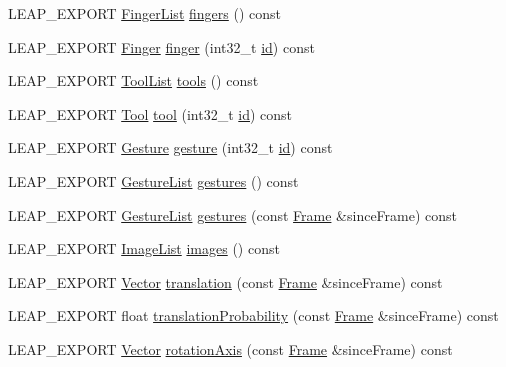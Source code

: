 \begin{DoxyCompactItemize}
\item 
L\+E\+A\+P\+\_\+\+E\+X\+P\+O\+RT \hyperlink{class_leap_1_1_finger_list}{Finger\+List} \hyperlink{class_leap_1_1_frame_ad26c14d07eae913a7ff17e0ce1f2be12}{fingers} () const
\item 
L\+E\+A\+P\+\_\+\+E\+X\+P\+O\+RT \hyperlink{class_leap_1_1_finger}{Finger} \hyperlink{class_leap_1_1_frame_aca038c853f530defa0fd551146e54259}{finger} (int32\+\_\+t \hyperlink{class_leap_1_1_frame_aac6e1192b900d50c42b3152bb059767f}{id}) const
\item 
L\+E\+A\+P\+\_\+\+E\+X\+P\+O\+RT \hyperlink{class_leap_1_1_tool_list}{Tool\+List} \hyperlink{class_leap_1_1_frame_a22ade80385331bef910b3bff3abd121c}{tools} () const
\item 
L\+E\+A\+P\+\_\+\+E\+X\+P\+O\+RT \hyperlink{class_leap_1_1_tool}{Tool} \hyperlink{class_leap_1_1_frame_a161325a08290ab7aec4d335f1a169ad3}{tool} (int32\+\_\+t \hyperlink{class_leap_1_1_frame_aac6e1192b900d50c42b3152bb059767f}{id}) const
\item 
L\+E\+A\+P\+\_\+\+E\+X\+P\+O\+RT \hyperlink{class_leap_1_1_gesture}{Gesture} \hyperlink{class_leap_1_1_frame_a107df376205952e9ade4237592494a0e}{gesture} (int32\+\_\+t \hyperlink{class_leap_1_1_frame_aac6e1192b900d50c42b3152bb059767f}{id}) const
\item 
L\+E\+A\+P\+\_\+\+E\+X\+P\+O\+RT \hyperlink{class_leap_1_1_gesture_list}{Gesture\+List} \hyperlink{class_leap_1_1_frame_a09f7850e3b1a92585f319c74e189cc0e}{gestures} () const
\item 
L\+E\+A\+P\+\_\+\+E\+X\+P\+O\+RT \hyperlink{class_leap_1_1_gesture_list}{Gesture\+List} \hyperlink{class_leap_1_1_frame_a7bd248e86b0ea9f4b683cd42ba715413}{gestures} (const \hyperlink{class_leap_1_1_frame}{Frame} \&since\+Frame) const
\item 
L\+E\+A\+P\+\_\+\+E\+X\+P\+O\+RT \hyperlink{class_leap_1_1_image_list}{Image\+List} \hyperlink{class_leap_1_1_frame_a64839985307492bf124b72ea13b1f2cf}{images} () const
\item 
L\+E\+A\+P\+\_\+\+E\+X\+P\+O\+RT \hyperlink{struct_leap_1_1_vector}{Vector} \hyperlink{class_leap_1_1_frame_ac1bd55621bc84dda1903801280dd9062}{translation} (const \hyperlink{class_leap_1_1_frame}{Frame} \&since\+Frame) const
\item 
L\+E\+A\+P\+\_\+\+E\+X\+P\+O\+RT float \hyperlink{class_leap_1_1_frame_a1b13d75fc19b390ad742013fb07eeb1b}{translation\+Probability} (const \hyperlink{class_leap_1_1_frame}{Frame} \&since\+Frame) const
\item 
L\+E\+A\+P\+\_\+\+E\+X\+P\+O\+RT \hyperlink{struct_leap_1_1_vector}{Vector} \hyperlink{class_leap_1_1_frame_ae79eca6afb867d7bc6c5a9b2b6caae0b}{rotation\+Axis} (const \hyperlink{class_leap_1_1_frame}{Frame} \&since\+Frame) const

\end{DoxyCompactItemize}
